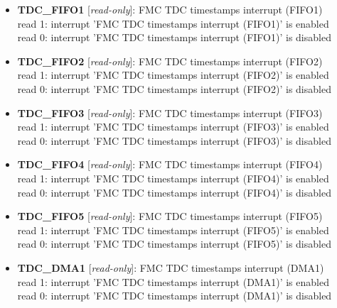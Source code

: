 \begin{itemize}
\item \begin{small}
{\bf 
TDC\_FIFO1
} [\emph{read-only}]: FMC TDC timestamps interrupt (FIFO1)
\\
read 1: interrupt 'FMC TDC timestamps interrupt (FIFO1)' is enabled\\read 0: interrupt 'FMC TDC timestamps interrupt (FIFO1)' is disabled
\end{small}
\item \begin{small}
{\bf 
TDC\_FIFO2
} [\emph{read-only}]: FMC TDC timestamps interrupt (FIFO2)
\\
read 1: interrupt 'FMC TDC timestamps interrupt (FIFO2)' is enabled\\read 0: interrupt 'FMC TDC timestamps interrupt (FIFO2)' is disabled
\end{small}
\item \begin{small}
{\bf 
TDC\_FIFO3
} [\emph{read-only}]: FMC TDC timestamps interrupt (FIFO3)
\\
read 1: interrupt 'FMC TDC timestamps interrupt (FIFO3)' is enabled\\read 0: interrupt 'FMC TDC timestamps interrupt (FIFO3)' is disabled
\end{small}
\item \begin{small}
{\bf 
TDC\_FIFO4
} [\emph{read-only}]: FMC TDC timestamps interrupt (FIFO4)
\\
read 1: interrupt 'FMC TDC timestamps interrupt (FIFO4)' is enabled\\read 0: interrupt 'FMC TDC timestamps interrupt (FIFO4)' is disabled
\end{small}
\item \begin{small}
{\bf 
TDC\_FIFO5
} [\emph{read-only}]: FMC TDC timestamps interrupt (FIFO5)
\\
read 1: interrupt 'FMC TDC timestamps interrupt (FIFO5)' is enabled\\read 0: interrupt 'FMC TDC timestamps interrupt (FIFO5)' is disabled
\end{small}
\item \begin{small}
{\bf 
TDC\_DMA1
} [\emph{read-only}]: FMC TDC timestamps interrupt (DMA1)
\\
read 1: interrupt 'FMC TDC timestamps interrupt (DMA1)' is enabled\\read 0: interrupt 'FMC TDC timestamps interrupt (DMA1)' is disabled

\end{small}
\end{itemize}
